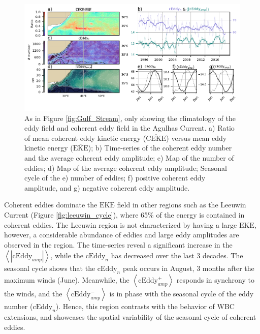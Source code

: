 \documentclass[draft,linenumbers]{agujournal2019}
\newcommand{\MEKE}{\overline{\textrm{EKE}}}
\newcommand{\EKE}{\textrm{EKE}}
\newcommand{\MCEKE}{\overline{\textrm{CEKE}}}
\newcommand{\cEddy}{\textrm{cEddy}}
\begin{document}
	\begin{figure}
	    \centering
	    \includegraphics[width=1\textwidth]{./figures/regional_ratios_and_stats_V3_2.pdf}
	    \caption{As in Figure \ref{fig:Gulf_Stream}, only showing the  climatology of the eddy field and coherent eddy field in the Agulhas Current. a) Ratio of mean coherent eddy kinetic energy ($\MCEKE$) versus mean eddy kinetic energy ($\MEKE$); b) Time-series of the coherent eddy number and the average coherent eddy amplitude; c) Map of the number of eddies; d) Map of the average coherent eddy amplitude; Seasonal cycle of the e) number of eddies; f) positive coherent eddy amplitude, and g) negative coherent eddy amplitude.}
	    \label{fig:Agulhas}
	\end{figure}

	Coherent eddies dominate the $\EKE$ field in other regions such as the Leeuwin Current (Figure \ref{fig:leeuwin_cycle}), where 65\% of the energy is contained in coherent eddies. 
	The Leeuwin region is not characterized by having a large $\EKE$, however, a considerable abundance of eddies and large eddy amplitudes are observed in the region. 
	The time-series reveal a significant increase in the $\left<|\cEddy_{amp}|\right>$, while the $\cEddy_{n}$ has decreased over the last 3 decades. 
	The seasonal cycle shows that the $\cEddy_{n}$ peak occurs in August, 3 months after the maximum winds (June). 
	Meanwhile, the $\left<\cEddy_{amp}^+\right>$ responds in synchrony to the winds, and the $\left<\cEddy_{amp}^-\right>$ is in phase with the seasonal cycle of the eddy number ($\cEddy_{n}$). 
	Hence, this region contrasts with the behavior of WBC extensions, and showcases the spatial variability of the seasonal cycle of coherent eddies.
 		
\end{document}
